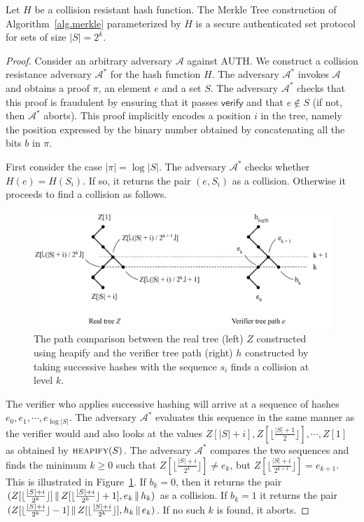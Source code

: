 \begin{theorem}[Security]
  Let $H$ be a collision resistant hash function. The Merkle Tree
  construction of Algorithm~\ref{alg.merkle} parameterized by $H$ is a secure
  authenticated set protocol for sets of size $|S| = 2^k$.
\end{theorem}
\begin{proof}
Consider an arbitrary adversary $\mathcal{A}$ against \textsf{AUTH}. We
construct a collision resistance adversary $\mathcal{A}^*$ for the hash function
$H$. The adversary $\mathcal{A}^*$ invokes $\mathcal{A}$ and obtains a proof
$\pi$, an element $e$ and a set $S$. The adversary $\mathcal{A}^*$ checks that
this proof is fraudulent by ensuring that it passes $\textsf{verify}$ and that
$e \not\in S$ (if not, then $\mathcal{A}^*$ aborts). This proof implicitly
encodes a position $i$ in the tree, namely the position expressed by the binary
number obtained by concatenating all the bits $b$ in $\pi$.

First consider the case $|\pi| = \log|S|$. The adversary $\mathcal{A}^*$
checks whether $H(e) = H(S_i)$. If so, it returns the pair $(e, S_i)$ as a
collision. Otherwise it proceeds to find a collision as follows.

\begin{figure}[tb]%
  \centering
  \includegraphics[width=\textwidth]{chapters/background/figures/mtpf.pdf}
  \caption{
    The path comparison between the real tree (left) $Z$ constructed using
    \textsf{heapify} and the verifier tree path (right) $h$ constructed by
    taking successive hashes with the sequence $s_i$ finds a collision at level
    $k$.
  }
  \label{fig.mtpf}
\end{figure}%

The verifier who applies successive hashing will arrive at a
sequence of hashes $e_0, e_1, \cdots, e_{\log|S|}$. The
adversary $\mathcal{A}^*$ evaluates this sequence in the same manner as the
verifier would and also looks at the values $Z[|S| + i], Z[\lfloor \frac{|S| + 1}{2} \rfloor],
\cdots, Z[1]$ as obtained by $\textsc{heapify}(S)$. The adversary
$\mathcal{A}^*$ compares the two sequences and finds the minimum $k \geq 0$ such that
$Z[\lfloor \frac{|S| + i}{2^k} \rfloor] \neq e_k$, but
$Z[\lfloor \frac{|S| + i}{2^{k + 1}} \rfloor] = e_{k + 1}$. This is illustrated
in Figure~\ref{fig.mtpf}.
If $b_k = 0$,
then it returns the pair
$(Z[\lfloor \frac{|S| + i}{2^k} \rfloor] \,\|\, Z[\lfloor \frac{|S| + i}{2^k} \rfloor + 1],\allowbreak e_k \,\|\, h_k)$ as a
collision. If $b_k = 1$ it returns the pair
$(Z[\lfloor \frac{|S| + i}{2^k} \rfloor - 1]\,\|\, Z[\lfloor \frac{|S| + i}{2^k} \rfloor],\allowbreak h_k \,\|\, e_k)$. If no such $k$ is found, it aborts.


\end{proof}
